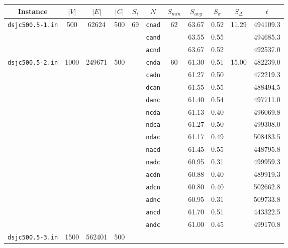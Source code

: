 \documentclass[paper=a4,fontsize=12pt]{scrartcl}
\begin{document}
\singlespacing
\begin{table}[p]
\centering
\begin{tabular}{|c|ccc|c|c|ccc|c|c|}
\hline
Instance & \multicolumn{1}{c}{$|V|$} & \multicolumn{1}{c}{$|E|$} & \multicolumn{1}{c|}{$|C|$} & \multicolumn{1}{c|}{$S_i$} & \multicolumn{1}{c|}{$N$} & $S_{min}$ & \multicolumn{1}{c}{$S_{avg}$} & \multicolumn{1}{c|}{$S_{\sigma}$} & \multicolumn{1}{c|}{$S_{\Delta}$} & \multicolumn{1}{c|}{$t$} \\
\hline\hline

\multirow{3}{*}{\texttt{dsjc500.5-1.in}} & \multirow{3}{*}{500} & \multirow{3}{*}{62624} & \multirow{3}{*}{500} & \multirow{32}{*}{69} &
      \texttt{cnad}	& \multirow{3}{*}{62}	& 63.67	& 0.52	& \multirow{3}{*}{11.29}	& 494109.3\\
&&&&& \texttt{cand}	&			& 63.55	& 0.55	&				& 494685.3\\
&&&&& \texttt{acnd}	&			& 63.67	& 0.52	&				& 492537.0\\
\cline{1-4}\cline{6-11}
\multirow{14}{*}{\texttt{dsjc500.5-2.in}} & \multirow{14}{*}{1000} & \multirow{14}{*}{249671} & \multirow{14}{*}{500} & &
      \texttt{cnda}	& \multirow{14}{*}{60}	& 61.30	& 0.51	& \multirow{14}{*}{15.00}	& 482239.0\\
&&&&& \texttt{cadn}	&			& 61.27	& 0.50	&				& 472219.3\\
&&&&& \texttt{dcan}	&			& 61.55	& 0.55	&				& 488494.5\\
&&&&& \texttt{danc}	&			& 61.40	& 0.54	&				& 497711.0\\
&&&&& \texttt{ncda}	&			& 61.13	& 0.40	&				& 496069.8\\
&&&&& \texttt{ndca}	&			& 61.27	& 0.50	&				& 499308.0\\
&&&&& \texttt{ndac}	&			& 61.17	& 0.49	&				& 508483.5\\
&&&&& \texttt{nacd}	&			& 61.45	& 0.55	&				& 448795.8\\
&&&&& \texttt{nadc}	&			& 60.95	& 0.31	&				& 499959.3\\
&&&&& \texttt{acdn}	&			& 60.88	& 0.40	&				& 489919.3\\
&&&&& \texttt{adcn}	&			& 60.80	& 0.40	&				& 502662.8\\
&&&&& \texttt{adnc}	&			& 60.95	& 0.31	&				& 509733.8\\
&&&&& \texttt{ancd}	&			& 61.70	& 0.51	&				& 443322.5\\
&&&&& \texttt{andc}	&			& 61.00	& 0.45	&				& 499170.8\\
\cline{1-4}\cline{6-11}
\multirow{14}{*}{\texttt{dsjc500.5-3.in}} & \multirow{14}{*}{1500} & \multirow{14}{*}{562401} & \multirow{14}{*}{500} & &

\end{tabular}
\end{table}
\end{document}
